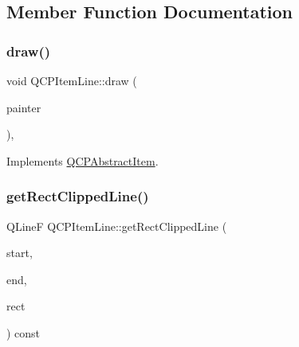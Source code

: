 \subsection{Member Function Documentation}
\mbox{\label{class_q_c_p_item_line_ae184140b61b2ef5b8edde76304447200}} 
\subsubsection{\texorpdfstring{draw()}{draw()}}
{\footnotesize\ttfamily void Q\+C\+P\+Item\+Line\+::draw (\begin{DoxyParamCaption}\item[{\hyperlink{class_q_c_p_painter}{Q\+C\+P\+Painter} $\ast$}]{painter }\end{DoxyParamCaption})\hspace{0.3cm}{\ttfamily [protected]}, {\ttfamily [virtual]}}



Implements \hyperlink{class_q_c_p_abstract_item_a007fdab79c935a5da5aa04a21d268c18}{Q\+C\+P\+Abstract\+Item}.

\mbox{\label{class_q_c_p_item_line_a7b00a1d82be8b961461cc4039acd12a3}} 
\subsubsection{\texorpdfstring{get\+Rect\+Clipped\+Line()}{getRectClippedLine()}}
{\footnotesize\ttfamily Q\+LineF Q\+C\+P\+Item\+Line\+::get\+Rect\+Clipped\+Line (\begin{DoxyParamCaption}\item[{const \hyperlink{class_q_c_p_vector2_d}{Q\+C\+P\+Vector2D} \&}]{start,  }\item[{const \hyperlink{class_q_c_p_vector2_d}{Q\+C\+P\+Vector2D} \&}]{end,  }\item[{const Q\+Rect \&}]{rect }\end{DoxyParamCaption}) const\hspace{0.3cm}{\ttfamily [protected]}}

\mbox{\label{class_q_c_p_item_line_a6cdc9e87e17418d4b0e66eaa0f041407}} 
